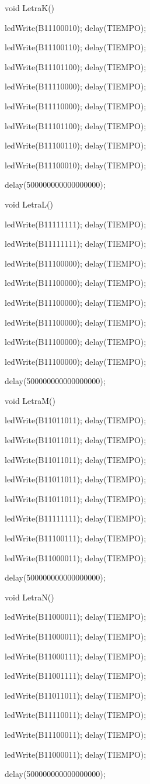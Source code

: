 \documentclass{article}
\begin{document}
void LetraK(){
   
   ledWrite(B11100010); delay(TIEMPO);
   
   ledWrite(B11100110); delay(TIEMPO);
   
   ledWrite(B11101100); delay(TIEMPO);
   
   ledWrite(B11110000); delay(TIEMPO);
   
   ledWrite(B11110000); delay(TIEMPO);
   
   ledWrite(B11101100); delay(TIEMPO);
   
   ledWrite(B11100110); delay(TIEMPO);
   
   ledWrite(B11100010); delay(TIEMPO);
   
   delay(500000000000000000);}

void LetraL(){
   
   ledWrite(B11111111); delay(TIEMPO);
   
   ledWrite(B11111111); delay(TIEMPO);
   
   ledWrite(B11100000); delay(TIEMPO);
   
   ledWrite(B11100000); delay(TIEMPO);
   
   ledWrite(B11100000); delay(TIEMPO);
   
   ledWrite(B11100000); delay(TIEMPO);
   
   ledWrite(B11100000); delay(TIEMPO);
   
   
   ledWrite(B11100000); delay(TIEMPO);
   
   delay(500000000000000000);}

void LetraM(){
  
   ledWrite(B11011011); delay(TIEMPO);
   
   ledWrite(B11011011); delay(TIEMPO);
   
   ledWrite(B11011011); delay(TIEMPO);
   
   ledWrite(B11011011); delay(TIEMPO);
   
   ledWrite(B11011011); delay(TIEMPO);
   
   ledWrite(B11111111); delay(TIEMPO);
   
   ledWrite(B11100111); delay(TIEMPO);
   
   ledWrite(B11000011); delay(TIEMPO);
   
   delay(500000000000000000);}

void LetraN(){
   
   ledWrite(B11000011); delay(TIEMPO);
   
   ledWrite(B11000011); delay(TIEMPO);
   
   ledWrite(B11000111); delay(TIEMPO);
   
   ledWrite(B11001111); delay(TIEMPO);
   
   ledWrite(B11011011); delay(TIEMPO);
   
   ledWrite(B11110011); delay(TIEMPO);
   
   ledWrite(B11100011); delay(TIEMPO);
   
   ledWrite(B11000011); delay(TIEMPO);
  
  delay(500000000000000000);}
\end{document}
